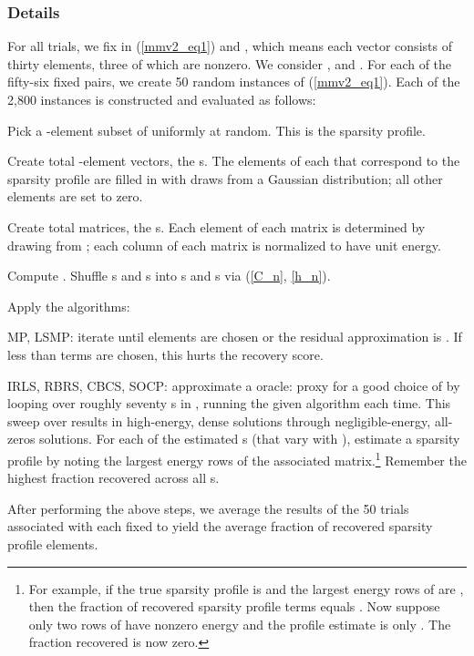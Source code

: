 \documentclass[final]{siamltex}
\newenvironment{adamItemize2}{\begin{list}{}
{\setlength{\rightmargin}{0em}
\setlength{\leftmargin}{1.0em}
\setlength{\itemsep}{4pt}
\setlength{\topsep}{2pt}
\setlength{\parsep}{0pt}}}{\end{list}}
\begin{document}
   \subsubsection{Details}\label{subsubsec:e1} For all trials, we fix
    in (\ref{mmv2_eq1}) and , which means each 
   vector consists of thirty elements, three of which are nonzero.  We
   consider , and .  For each of the fifty-six fixed  pairs, we create
   50 random instances of (\ref{mmv2_eq1}).  Each of the 2,800
   instances is constructed and evaluated as follows:
   \begin{adamItemize2}

   \item Pick a -element subset of  uniformly
   at random.  This is the sparsity profile.

   \item Create  total -element vectors, the s.  The
    elements of each that correspond to the sparsity profile are
   filled in with draws from a Gaussian 
   distribution; all other elements are set to zero.

   \item Create  total  matrices, the s.
   Each element of each matrix is determined by drawing from
   ; each column of each matrix is normalized to
   have unit  energy.

   \item Compute . Shuffle
   s and s into s and s via
   (\ref{C_n}, \ref{h_n}).

   \item Apply the algorithms:

       \begin{adamItemize2}

       \item[] MP, LSMP: iterate until  elements are chosen
       or the residual approximation is .  If less than 
       terms are chosen, this hurts the recovery score.

       \item[] IRLS, RBRS, CBCS, SOCP: approximate a 
       oracle: proxy for a good choice of  by looping over
       roughly seventy s in , running the given
       algorithm each time.  This sweep over  results in
       high-energy, dense solutions through negligible-energy,
       all-zeros solutions.  For each of the estimated
       s (that vary with ),
       estimate a sparsity profile by noting the largest 
       energy rows of the associated 
       matrix.\footnote{For example, if the true sparsity profile is
        and the largest  energy rows of
        are , then the fraction of
       recovered sparsity profile terms equals .  Now
       suppose only two rows of  have nonzero energy
       and the profile estimate is only .  The fraction
       recovered is now zero.} Remember the highest fraction
       recovered across all s.

       \end{adamItemize2}

   \end{adamItemize2}
   After performing the above steps, we average the results of the 50
   trials associated with each fixed  to yield the average
   fraction of recovered sparsity profile elements.
\end{document}
